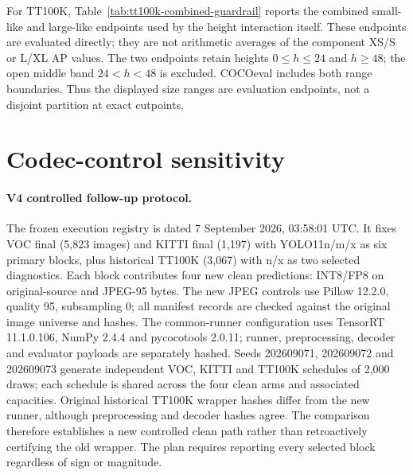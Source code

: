 \documentclass[10pt]{article}
\newcommand{\DeltaPsi}{\Delta\Psi}
\begin{document}
\begin{table}[htbp]
\centering
\caption{Size-specific absolute-accuracy guardrail. Values are balanced means
across 36 model--corruption--severity cells per row.}
\label{tab:size-guardrail}
\scriptsize
\resizebox{\textwidth}{!}{}
\end{table}

For TT100K, Table~\ref{tab:tt100k-combined-guardrail} reports the combined
small-like and large-like endpoints used by the height interaction itself.
These endpoints are evaluated directly; they are not arithmetic averages of
the component XS/S or L/XL AP values. The two endpoints retain heights
$0\leq h\leq24$ and $h\geq48$; the open middle band $24<h<48$ is excluded.
COCOeval includes both range boundaries. Thus the displayed size ranges are
evaluation endpoints, not a disjoint partition at exact cutpoints.

\begin{table}[htbp]
\centering
\caption{TT100K absolute-accuracy guardrail for the combined original-height
endpoints used in $\DeltaPsi$. $D$ is the signed clean-to-corrupted AP loss.}
\label{tab:tt100k-combined-guardrail}
\small
\resizebox{0.94\textwidth}{!}{}
\end{table}

\FloatBarrier

\section{Codec-control sensitivity}

\paragraph{V4 controlled follow-up protocol.}
The frozen execution registry is dated 7 September 2026, 03:58:01 UTC. It fixes
VOC final (5,823 images) and KITTI final (1,197) with YOLO11n/m/x as six primary
blocks, plus historical TT100K (3,067) with n/x as two selected diagnostics.
Each block contributes four new clean predictions: INT8/FP8 on original-source
and JPEG-95 bytes. The new JPEG controls use Pillow 12.2.0, quality 95,
subsampling 0; all manifest records are checked against the original image
universe and hashes. The common-runner configuration uses TensorRT 11.1.0.106,
NumPy 2.4.4 and pycocotools 2.0.11; runner, preprocessing, decoder and evaluator
payloads are separately hashed. Seeds 202609071, 202609072 and 202609073 generate
independent VOC, KITTI and TT100K schedules of 2,000 draws; each schedule is shared
across the four clean arms and associated capacities. Original historical
TT100K wrapper hashes differ from the new runner, although preprocessing and
decoder hashes agree. The comparison therefore establishes a new controlled
clean path rather than retroactively certifying the old wrapper. The plan
requires reporting every selected block regardless of sign or magnitude.
\end{document}
